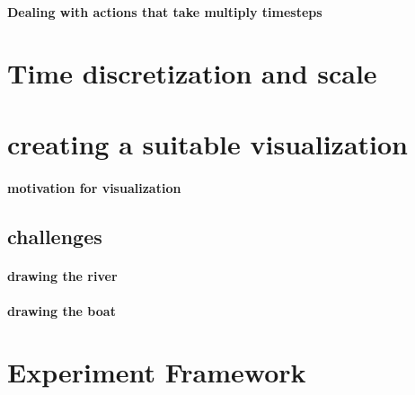       \paragraph{Dealing with actions that take multiply timesteps}
      
  \section{Time discretization and scale}
    
    
  \section{creating a suitable visualization}
    \paragraph{motivation for visualization}
    \subsection{challenges}
      \paragraph{drawing the river}
      \paragraph{drawing the boat}
      
  \section{Experiment Framework}
